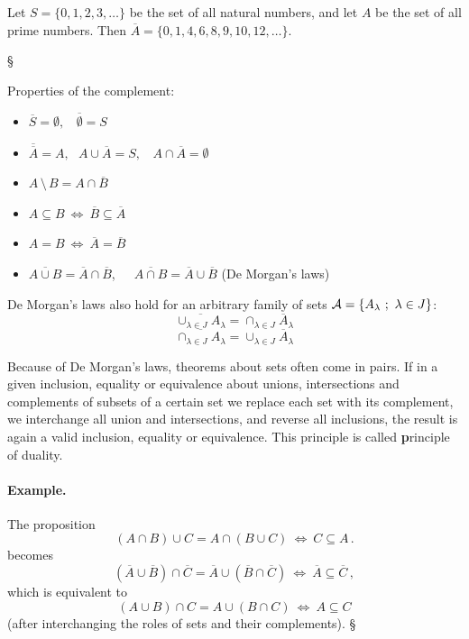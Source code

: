 \documentclass[11pt,paper=b5,footinclude,headinclude]{scrbook} %
\def\brez {{\,\setminus\,}}
\def\cee {{~\Leftrightarrow~}}
\def\kz{{\hfill{\S}}}%
\theoremstyle{remark}
\theoremstyle{definition} %
\begin{document}
Let $S = \{0,1,2,3,\ldots\}$ be the set of all natural numbers, and let $A$ be the set of all prime numbers.
Then $\overline A = \{0,1,4,6,8,9,10,12,\ldots\}$.

\kz

\medskip
Properties of the complement:
\begin{itemize}
  \item
$\overline S = \emptyset,~~~~\overline \emptyset = S$

  \item
$\overline{\overline A} = A,~~~A\cup \overline A = S,~~~~A\cap \overline A = \emptyset$

  \item
$A\brez B = A\cap \overline B$

  \item
$A\subseteq B \cee  \overline B \subseteq \overline A$

  \item
$A= B \cee  \overline A = \overline B$

  \item
$\overline{A\cup B} = \overline A\cap \overline B$,~~~$\overline{A\cap B} = \overline A\cup \overline B$ (De Morgan's laws)
\end{itemize}

De Morgan's laws also hold for an arbitrary family of sets ${\cal A} = \{A_\lambda~;~\lambda\in J\}$:
$$\overline{\cup_{\lambda\in J}A_\lambda} = {\cap_{\lambda\in J}\overline A_\lambda}$$
$$\overline{\cap_{\lambda\in J}A_\lambda} = {\cup_{\lambda\in J}\overline A_\lambda}$$

Because of De Morgan's laws, theorems about sets often come in pairs.
If in a given inclusion, equality or equivalence about unions, intersections and complements of  subsets of a certain set we replace each set with its complement, we interchange all union and intersections, and reverse all inclusions, the result is again a valid inclusion, equality or equivalence. This principle is called {\textbf principle of duality}.

\bigskip
\paragraph{Example.}

The proposition
$$(A\cap B)\cup C = A\cap (B\cup C) \cee C\subseteq A\,.$$
becomes
$$(\overline A\cup \overline B)\cap \overline C = \overline A\cup (\overline B\cap \overline C) \cee \overline A\subseteq \overline C\,,$$
which is equivalent to
$$(A\cup B)\cap C = A\cup (B\cap C) \cee A\subseteq C$$
(after interchanging the roles of sets and their complements).
\kz
\end{document}
